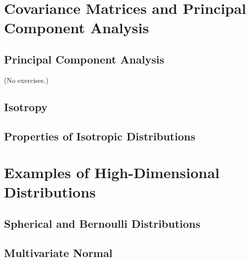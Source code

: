 \documentclass{report}
\theoremstyle{definition}
\newenvironment{exercise}[1]{
  \renewcommand\theexerciseimpl{#1}
  \exerciseimpl
}{\endexerciseimpl}
\begin{document}
\section{Covariance Matrices and Principal Component Analysis}

\subsection{Principal Component Analysis}

(No exercises.)

\subsection{Isotropy}

\begin{exercise}{3.2.2}
\end{exercise}

\subsection{Properties of Isotropic Distributions}

\begin{exercise}{3.2.6}
\end{exercise}

\section{Examples of High-Dimensional Distributions}

\subsection{Spherical and Bernoulli Distributions}

\begin{exercise}{3.3.1}
\end{exercise}

\subsection{Multivariate Normal}

\begin{exercise}{3.3.3}
\end{exercise}

\begin{exercise}{3.3.4}
\end{exercise}

\begin{exercise}{3.3.5}
\end{exercise}
\end{document}
